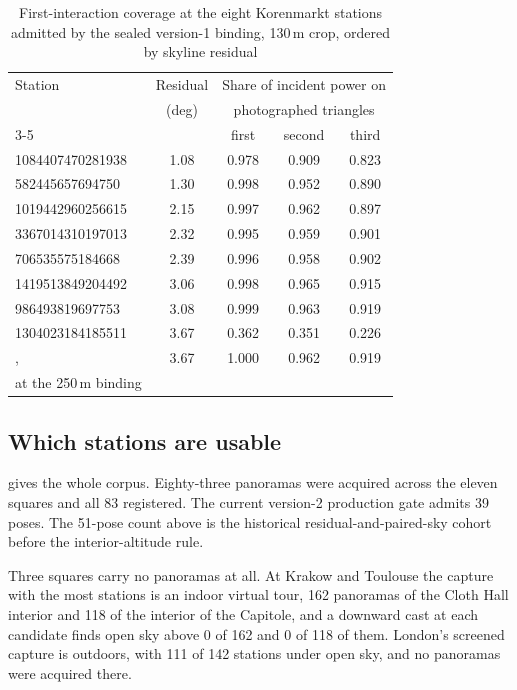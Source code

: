 \documentclass[journal]{IEEEtran}
\begin{document}
\begin{table}[!t]
  \caption{First-interaction coverage at the eight Korenmarkt stations admitted
  by the sealed version-1 binding, 130\,m crop, ordered by skyline residual}
  \label{tab:si-station-coverage}
  \centering
  \begin{tabular}{lcccc}
    \toprule
    Station & Residual & \multicolumn{3}{c}{Share of incident power on} \\
     & (deg) & \multicolumn{3}{c}{photographed triangles} \\
    \cmidrule(l){3-5}
     & & first & second & third \\
    \midrule
    1084407470281938 & 1.08 & 0.978 & 0.909 & 0.823 \\
    582445657694750  & 1.30 & 0.998 & 0.952 & 0.890 \\
    1019442960256615 & 2.15 & 0.997 & 0.962 & 0.897 \\
    3367014310197013 & 2.32 & 0.995 & 0.959 & 0.901 \\
    706535575184668  & 2.39 & 0.996 & 0.958 & 0.902 \\
    1419513849204492 & 3.06 & 0.998 & 0.965 & 0.915 \\
    986493819697753  & 3.08 & 0.999 & 0.963 & 0.919 \\
    1304023184185511 & 3.67 & 0.362 & 0.351 & 0.226 \\
    \addlinespace
    1304023184185511, & 3.67 & 1.000 & 0.962 & 0.919 \\
    \quad at the 250\,m binding & & & & \\
    \bottomrule
  \end{tabular}
\end{table}

\subsection{Which stations are usable}

 gives the whole corpus. Eighty-three panoramas were
acquired across the eleven squares and all 83 registered. The current
version-2 production gate admits 39 poses. The 51-pose count above is the
historical residual-and-paired-sky cohort before the interior-altitude rule.

Three squares carry no panoramas at all. At Krakow and Toulouse the capture with
the most stations is an indoor virtual tour, 162 panoramas of the Cloth Hall
interior and 118 of the interior of the Capitole, and a downward cast at each
candidate finds open sky above 0 of 162 and 0 of 118 of them. London's screened
capture is outdoors, with 111 of 142 stations under open sky, and no panoramas
were acquired there.
\end{document}
